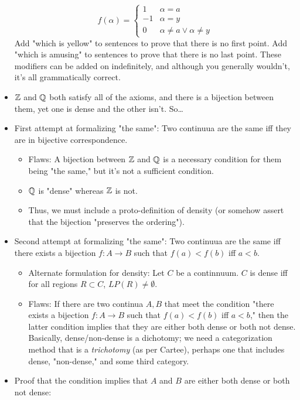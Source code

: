 \documentclass[titlepage]{report}
\begin{document}
\begin{itemize}
    \begin{equation*}
        f(\alpha) =
        \begin{cases}
            1 & \alpha=a\\
            -1 & \alpha=y\\
            0 & \alpha\neq a\vee\alpha\neq y
        \end{cases}
    \end{equation*}
    Add "which is yellow" to sentences to prove that there is no first point. Add "which is amusing" to sentences to prove that there is no last point. These modifiers can be added on indefinitely, and although you generally wouldn't, it's all grammatically correct.
    \item $\mathbb{Z}$ and $\mathbb{Q}$ both satisfy all of the axioms, and there is a bijection between them, yet one is dense and the other isn't. So\dots
    \item {}First attempt at formalizing "the same": Two continuua are the same iff they are in bijective correspondence.
    \begin{itemize}
        \item Flaws: A bijection between $\mathbb{Z}$ and $\mathbb{Q}$ is a necessary condition for them being "the same," but it's not a sufficient condition.
        \item $\mathbb{Q}$ is "dense" whereas $\mathbb{Z}$ is not.
        \item Thus, we must include a proto-definition of density (or somehow assert that the bijection "preserves the ordering").
    \end{itemize}
    \item Second attempt at formalizing "the same": Two continuua are the same iff there exists a bijection $f:A\to B$ such that $f(a)<f(b)$ iff $a<b$.
    \begin{itemize}
        \item Alternate formulation for density: Let $C$ be a continnuum. $C$ is dense iff for all regions $R\subset C$, $LP(R)\neq\emptyset$.
        \item Flaws: If there are two continua $A,B$ that meet the condition "there exists a bijection $f:A\to B$ such that $f(a)<f(b)$ iff $a<b$," then the latter condition implies that they are either both dense or both not dense. Basically, dense/non-dense is a dichotomy; we need a categorization method that is a \emph{trichotomy} (as per Cartee), perhaps one that includes dense, "non-dense," and some third category.
    \end{itemize}
    \item Proof that the condition implies that $A$ and $B$ are either both dense or both not dense:

\end{itemize}
\end{document}
